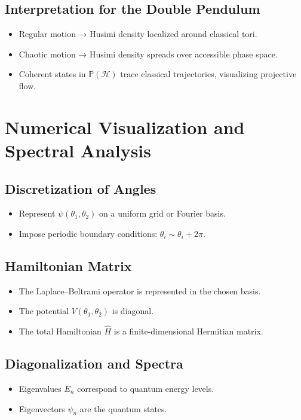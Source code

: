 \documentclass[11pt]{book}
\begin{document}
\section{Interpretation for the Double Pendulum}
\begin{itemize}
   \item
 Regular motion → Husimi density localized around classical tori.  
    \item
 Chaotic motion → Husimi density spreads over accessible phase space.  
    \item
 Coherent states in $\mathbb{P}(\mathcal{H})$ trace classical trajectories, 
        visualizing projective flow.
\end{itemize}


\chapter{Numerical Visualization and Spectral Analysis}

\section{Discretization of Angles}
\begin{itemize}
   \item
 Represent $\psi(\theta_1,\theta_2)$ on a uniform grid or Fourier basis.  
    \item
 Impose periodic boundary conditions: $\theta_i \sim \theta_i + 2\pi$.  
\end{itemize}

\section{Hamiltonian Matrix}
\begin{itemize}
   \item
 The Laplace–Beltrami operator is represented in the chosen basis.  
  \item
 The potential $V(\theta_1,\theta_2)$ is diagonal.  
  \item
 The total Hamiltonian $\hat H$ is a finite-dimensional Hermitian matrix.
\end{itemize}

\section{Diagonalization and Spectra}
\begin{itemize}
   \item
 Eigenvalues $E_n$ correspond to quantum energy levels.  
   \item
 Eigenvectors $\psi_n$ are the quantum states.  
\end{itemize}
\end{document}
